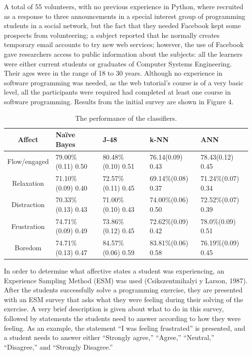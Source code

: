 \documentclass[conference]{IEEEtran}
\begin{document}
A total of 55 volunteers, with no previous experience in Python, where recruited
as a response to three announcements in a special interest group of programming
students in a social network, but the fact that they needed Facebook kept some prospects from
volunteering; a subject reported that he normally creates temporary email
accounts to try new web services; however, the use of Facebook gave researchers access to public
information about the subjects:  all the learners were either current students or
graduates of Computer Systems Engineering. Their ages were in the range of 18 to
30 years. Although no experience in software programming was needed, as the
web tutorial's course is of a very basic level, all the participants were
required had completed at least one course in software programming. Results from
the initial survey are shown in Figure 4. %
\begin{table}[!t]
\centering
\caption{The performance of the classifiers.}
    \begin{tabular}{ | c | l | l | l | l | }
    \hline
    Affect          & Na\"ive Bayes           & J-48                & k-NN              & ANN \\
    \hline
    Flow/engaged    & 79.00\% (0.11) 0.50   & 80.48\% (0.10) 0.51 & 76.14(0.09) 0.43    & 78.43(0.12) 0.45 \\
    \hline
    Relaxation      & 71.10\% (0.09) 0.40   & 72.57\% (0.11) 0.45 & 69.14\%(0.08)  0.37 & 71.24\%(0.07)  0.34\\
    \hline
    Distraction     & 70.33\% (0.13)  0.43  & 71.00\% (0.10) 0.43 & 74.00\%(0.06)  0.50 & 72.52\%(0.07)  0.39\\
    \hline
    Frustration     & 74.71\% (0.09) 0.49   & 73.86\% (0.12) 0.45 & 72.62\%(0.09)  0.42 & 78.0\%(0.09)  0.51 \\
    \hline
    Boredom         & 74.71\% (0.13) 0.47   & 84.57\% (0.06) 0.59 & 83.81\%(0.06)  0.58 & 76.19\%(0.09)  0.45\\
    \hline
    \end{tabular}
\end{table}



In order to determine what affective states a student was experiencing, an
Experience Sampling Method (ESM) was used (Csikszentmihalyi y Larson, 1987).
After the students successfully solve a programming exercise, they are presented
with an ESM survey that asks what they were feeling during their solving of the
exercise. A very brief description is given about what to do in this survey,
followed by statements the students need to answer according to how they were
feeling. As an example, the statement “I was feeling frustrated” is presented,
and a student needs to answer either “Strongly agree,” “Agree,” “Neutral,”
“Disagree,” and “Strongly Disagree.”
\end{document}
